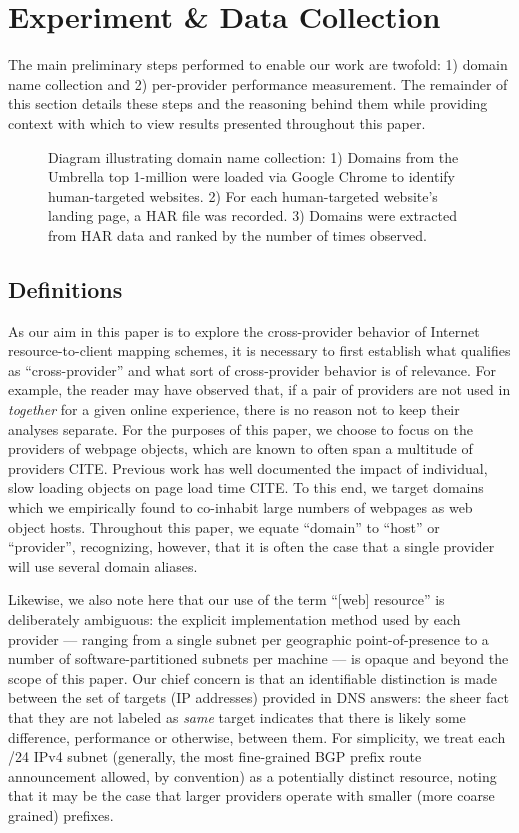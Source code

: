 \section{Experiment \& Data Collection} \label{oversky}

The main preliminary steps performed to enable our
work are twofold: 1) domain name collection and 2) per-provider performance
measurement. The
remainder of this section details these steps and the reasoning behind them
while providing context with which to view results presented throughout this paper. 

\begin{figure}
    \caption{Diagram illustrating domain name collection: 1) Domains from the Umbrella top 1-million were loaded via Google Chrome to identify human-targeted websites. 2) For each human-targeted website's landing page, a HAR file was recorded. 3) Domains were extracted from HAR data and ranked by the number of times observed.
    }
    \label{fig:domfind}
\end{figure}

\subsection{Definitions}

As our aim in this paper is to explore the cross-provider behavior of Internet
resource-to-client mapping schemes, it is necessary to first establish what
qualifies as ``cross-provider'' and what sort of cross-provider behavior is of
relevance. For example, the reader may have observed that, if a pair of
providers are not used in \emph{together} for a given online experience, there
is no reason not to keep their analyses separate. For the purposes of this
paper, we choose to focus on the providers of webpage objects, which are known
to often span a multitude of providers CITE. Previous work has well documented
the impact of individual, slow loading objects on page load time CITE. To this
end, we target domains which we empirically found to co-inhabit large numbers of
webpages as web object hosts. Throughout this paper, we equate ``domain'' to
``host'' or ``provider'', recognizing, however, that it is often the case that a
single provider will use several domain aliases. 

Likewise, we also note here that our use of the term ``[web] resource'' is
deliberately ambiguous: the explicit implementation method used by each provider
--- ranging from a single subnet per geographic point-of-presence to a number of
software-partitioned subnets per machine --- is opaque and beyond the scope of
this paper. Our chief concern is that an identifiable distinction is made
between the set of targets (IP addresses) provided in DNS answers: the sheer fact that they are not
labeled as \emph{same} target indicates that there is likely some difference,
performance or otherwise, between them. For simplicity, we treat
each /24 IPv4 subnet (generally, the most fine-grained BGP prefix route
announcement allowed, by convention) as a potentially distinct resource, noting
that it may be the case that larger providers operate with smaller (more coarse
grained) prefixes.

